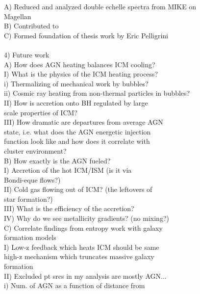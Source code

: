 \documentclass[12pt]{article}
\begin{document}
\begin{tabbing}
\>	A) Reduced and analyzed double echelle spectra from MIKE on\\
\>\>	   Magellan\\
\>	B) Contributed to \cite{2007ApJ...659.1265S}\\
\>	C) Formed foundation of thesis work by Eric Pelligrini\\
\\
4) Future work\\
\>	A) How does AGN heating balances ICM cooling?\\
\>\>		I)   What is the physics of the ICM heating process?\\
\>\>\>\>		i)   Thermalizing of mechanical work by bubbles?\\
\>\>\>\>		ii)  Cosmic ray heating from non-thermal particles in bubbles?\\
\>\>		II)  How is accretion onto BH regulated by large\\
\>\>\>		     scale properties of ICM?\\
\>\>		III) How dramatic are departures from average AGN\\
\>\>\>		     state, i.e. what does the AGN energetic injection\\
\>\>\>		     function look like and how does it correlate with\\
\>\>\>		     cluster environment?\\
\>	B) How exactly is the AGN fueled?\\
\>\>\>		I)   Accretion of the hot ICM/ISM (is it via\\
\>\>\>\>	     Bondi-eque flows?)\\
\>\>\>		II)  Cold gas flowing out of ICM? (the leftovers of\\
\>\>\>\>	     star formation?)\\
\>\>\>		III) What is the efficiency of the accretion?\\
\>\>\>		IV)  Why do we see metallicity gradients? (no mixing?)\\
\>	C) Correlate findings from entropy work with galaxy\\
\>\>	   formation models\\
\>\>\>		I)   Low-z feedback which heats ICM should be same\\
\>\>\>\>	     high-z mechanism which truncates massive galaxy\\
\>\>\>\>	     formation\\
\>\>\>		II)  Excluded pt srcs in my analysis are mostly AGN...\\
\>\>\>\>		i)   Num. of AGN as a function of distance from\\

\end{tabbing}
\end{document}

